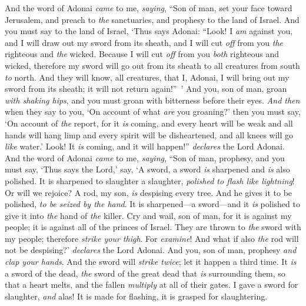 \begin{biblechapter} %
 And the word of Adonai \textit{came} to me, \textit{saying},
\verse “Son of man, set your face toward Jerusalem, and preach to \textit{the} sanctuaries, and prophesy to the land of Israel.
\verse And you must say to the land of Israel, ‘Thus says Adonai: “Look! I \textit{am} against you, and I will draw out my sword from its sheath, and I will cut \textit{off} from you \textit{the} righteous and \textit{the} wicked.
\verse Because I will cut \textit{off} from you \textit{both} righteous and wicked, therefore my sword will go out from its sheath to all creatures from south \textit{to} north.
\verse And they will know, all creatures, that I, Adonai, I will bring out my sword from its sheath; it will not return again!” ’
\verse And you, son of man, groan \textit{with shaking hips}, and you must groan with bitterness before their eyes.
\verse \textit{And then} when they say to you, ‘On account of what \textit{are} you groaning?’ then you must say, ‘On account of \textit{the} report, for it \textit{is} coming, and every heart will be weak and all hands will hang limp and every spirit will be disheartened, and all knees will go \textit{like} water.’ Look! It \textit{is} coming, and it will happen!” \textit{declares} the Lord Adonai.
\verse And the word of Adonai \textit{came} to me, \textit{saying},
\verse “Son of man, prophesy, and you must say, ‘Thus says the Lord,’ say, ‘A sword, a sword \textit{is} sharpened and \textit{is} also polished.
\verse It is sharpened to slaughter a slaughter, \textit{polished to flash like lightning}! Or will we rejoice? A rod, my son, \textit{is} despising every tree.
\verse And he gives it to be polished, \textit{to be seized by the hand}. It is sharpened—a sword—and it \textit{is} polished to give it into \textit{the} hand of \textit{the} killer.
\verse Cry and wail, son of man, for it is against my people; it is against all of the princes of Israel. They are thrown to \textit{the} sword with my people; therefore \textit{strike your thigh}.
\verse For \textit{examine}! And what if also \textit{the} rod will not be despising?’ \textit{declares} the Lord Adonai.
\verse And you, son of man, prophesy \textit{and clap your hands}. And the sword will \textit{strike twice}; let it happen a third time. It \textit{is} a sword of the dead, \textit{the} sword of the great dead that \textit{is} surrounding them,
\verse so that a heart melts, and the fallen \textit{multiply} at all of their gates. I gave a sword for slaughter, \textit{and} alas! It is made for flashing, it is grasped for slaughtering.

\end{biblechapter}
